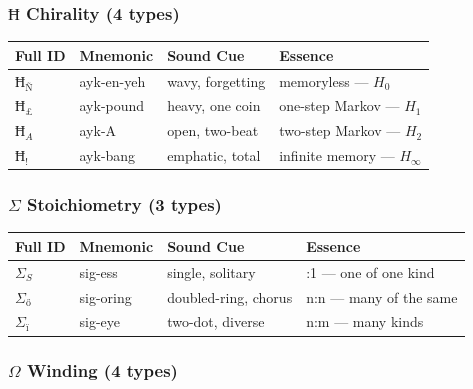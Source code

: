 \documentclass[12pt,a4paper]{article}
\begin{document}
\subsubsection{$Ħ$ Chirality (4 types)}

\begin{table}[htbp]
\centering
\small
{}
\begin{tabularx}{\textwidth}{>{\centering\arraybackslash}X >{\centering\arraybackslash}X >{\centering\arraybackslash}X >{\centering\arraybackslash}X}
\toprule
\rowcolor{gray!25}\textbf{Full ID} & \textbf{Mnemonic} & \textbf{Sound Cue} & \textbf{Essence} \\
\midrule
\rowcolors{1}{white}{gray!10}
$Ħ_{\text{Ñ}}$ & ayk-en-yeh & wavy, forgetting & memoryless --- $H_0$ \\
$Ħ_{\text{£}}$ & ayk-pound & heavy, one coin & one-step Markov --- $H_1$ \\
$Ħ_{A}$ & ayk-A & open, two-beat & two-step Markov --- $H_2$ \\
$Ħ_{!}$ & ayk-bang & emphatic, total & infinite memory --- $H_{\infty}$ \\
\bottomrule
\end{tabularx}
\end{table}

\subsubsection{$\Sigma$ Stoichiometry (3 types)}

\begin{table}[htbp]
\centering
\small
{}
\begin{tabularx}{\textwidth}{>{\centering\arraybackslash}X >{\centering\arraybackslash}X >{\centering\arraybackslash}X >{\centering\arraybackslash}X}
\toprule
\rowcolor{gray!25}\textbf{Full ID} & \textbf{Mnemonic} & \textbf{Sound Cue} & \textbf{Essence} \\
\midrule
\rowcolors{1}{white}{gray!10}
$\Sigma_{S}$ & sig-ess & single, solitary & 1:1 --- one of one kind \\
$\Sigma_{\text{ő}}$ & sig-oring & doubled-ring, chorus & n:n --- many of the same \\
$\Sigma_{\text{ï}}$ & sig-eye & two-dot, diverse & n:m --- many kinds \\
\bottomrule
\end{tabularx}
\end{table}

\subsubsection{$\Omega$ Winding (4 types)}
\end{document}
